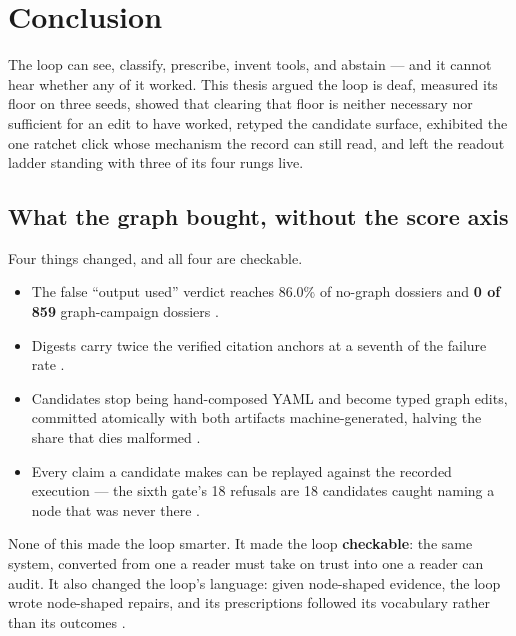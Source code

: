 \chapter{Conclusion}
\label{ch:conclusion}

The loop can see, classify, prescribe, invent tools, and abstain --- and it
cannot hear whether any of it worked. This thesis argued the loop is deaf,
measured its floor on three seeds, showed that clearing that
floor is neither necessary nor sufficient for an edit to have worked,
retyped the candidate surface, exhibited the one ratchet click whose
mechanism the record can still read, and left the readout ladder standing
with three of its four rungs live.

\section*{What the graph bought, without the score axis}

Four things changed, and all four are checkable.

\begin{itemize}
  \item The false ``output used'' verdict reaches $86.0\%$ of no-graph
        dossiers and \textbf{0 of 859} graph-campaign dossiers
        .
  \item Digests carry twice the verified citation anchors at a seventh of
        the failure rate .
  \item Candidates stop being hand-composed YAML and become typed graph
        edits, committed atomically with both artifacts machine-generated,
        halving the share that dies malformed .
  \item Every claim a candidate makes can be replayed against the recorded
        execution --- the sixth gate's 18 refusals are 18 candidates caught
        naming a node that was never there .
\end{itemize}

None of this made the loop smarter. It made the loop
\textbf{checkable}: the same system, converted from one a reader must take
on trust into one a reader can audit. It also changed the loop's language: given node-shaped evidence, the
loop wrote node-shaped repairs, and its prescriptions followed its
vocabulary rather than its outcomes .

